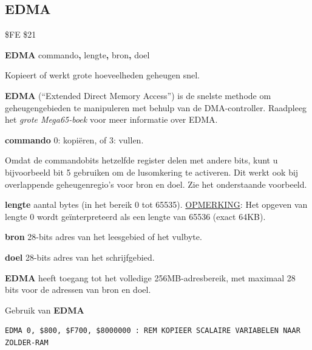 \subsection{EDMA}
\label{BASIC 65 Commands!EDMA}
\begin{description}[leftmargin=2cm,style=nextline]
\item [Token:]    \$FE \$21

\item [Formaat:]   {\bf EDMA} commando{\bf,} lengte{\bf,} bron{\bf,} doel

\item [Gebruik:]    Kopieert of werkt grote hoeveelheden geheugen snel.

{\bf EDMA} (``Extended Direct Memory Access'') is de snelste methode om geheugengebieden te manipuleren met behulp van de DMA-controller. Raadpleeg \ifdefined\printmanual                     het {\em grote Mega65-boek}
                  \else
                  \fi
                  voor meer informatie over EDMA.

                  {\bf commando} 0: kopiëren, of 3: vullen.

                  Omdat de commandobits hetzelfde register delen met andere bits, kunt u bijvoorbeeld bit 5 gebruiken om de lusomkering te activeren. Dit werkt ook bij overlappende geheugenregio's voor bron en doel. Zie het onderstaande voorbeeld.

{\bf lengte} aantal bytes (in het bereik 0 tot 65535). \underline{OPMERKING}: Het opgeven van lengte 0 wordt geïnterpreteerd als een lengte van 65536 (exact 64KB).

                  {\bf bron} 28-bits adres van het leesgebied of het vulbyte.

                  {\bf doel} 28-bits adres van het schrijfgebied.

\item [Opmerkingen:]  {\bf EDMA} heeft toegang tot het volledige 256MB-adresbereik, met maximaal 28 bits voor de adressen van bron en doel.

\item [Voorbeelden:] Gebruik van {\bf EDMA}

\begin{tcolorbox}[colback=black,coltext=white]
\verbatimfont{\codefont}
\begin{verbatim}
EDMA 0, $800, $F700, $8000000 : REM KOPIEER SCALAIRE VARIABELEN NAAR ZOLDER-RAM


\end{verbatim}
\end{tcolorbox}
\end{description}
